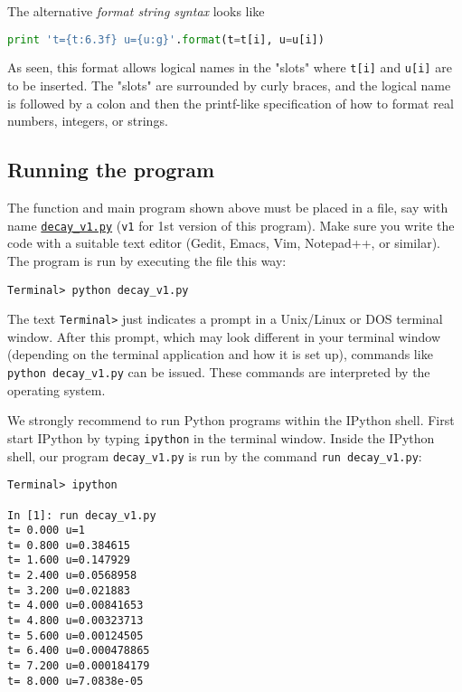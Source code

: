 \documentclass[graybox,sectrefs,envcountresetchap,open=right,final]{svmonodo}
\begin{document}

The alternative \emph{format string syntax} looks like
\begin{lstlisting}[language=Python,style=blue1_bluegreen]
print 't={t:6.3f} u={u:g}'.format(t=t[i], u=u[i])
\end{lstlisting}
As seen, this format allows logical names in the "slots" where
\texttt{t[i]} and \texttt{u[i]} are to be inserted. The "slots" are surrounded
by curly braces, and the logical name is followed by a colon and
then the printf-like specification of how to format real numbers,
integers, or strings.

\subsection{Running the program}

The function and main program shown above must be placed in a file,
say with name \href{{http://tinyurl.com/ofkw6kc/alg/decay_v1.py}}{\nolinkurl{decay_v1.py}} (\texttt{v1} for 1st version of this program).  Make sure you
write the code with a suitable text editor (Gedit, Emacs, Vim,
Notepad++, or similar).  The program is run by executing the file this
way:

\begin{Verbatim}[frame=lines,label=\fbox{{\tiny Terminal}},framesep=2.5mm,framerule=0.7pt,fontsize=\fontsize{9pt}{9pt}]
Terminal> python decay_v1.py
\end{Verbatim}
The text \texttt{Terminal>} just indicates a prompt in a
Unix/Linux or DOS terminal window. After this prompt, which may look
different in your terminal window (depending on the terminal application
and how it is set up), commands like \Verb!python decay_v1.py! can be issued.
These commands are interpreted by the operating system.

We strongly recommend to run Python programs within the IPython shell.
First start IPython by typing \texttt{ipython} in the terminal window.
Inside the IPython shell, our program \Verb!decay_v1.py! is run by the command
\Verb!run decay_v1.py!:

\begin{Verbatim}[frame=lines,label=\fbox{{\tiny Terminal}},framesep=2.5mm,framerule=0.7pt,fontsize=\fontsize{9pt}{9pt}]
Terminal> ipython

In [1]: run decay_v1.py
t= 0.000 u=1
t= 0.800 u=0.384615
t= 1.600 u=0.147929
t= 2.400 u=0.0568958
t= 3.200 u=0.021883
t= 4.000 u=0.00841653
t= 4.800 u=0.00323713
t= 5.600 u=0.00124505
t= 6.400 u=0.000478865
t= 7.200 u=0.000184179
t= 8.000 u=7.0838e-05
\end{Verbatim}
\end{document}

